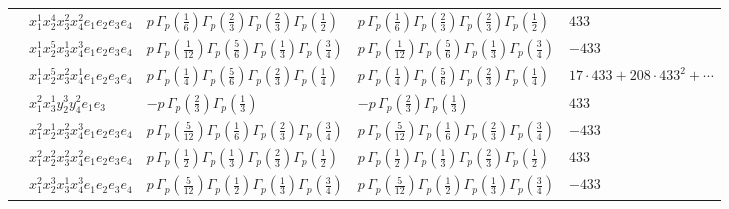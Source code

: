 \documentclass[11pt]{article}
\begin{document}
\begin{table}[ht]
{\begin{tabular}{@{}lllll@{}}
 & $x_{1}^{1} x_{2}^{4} x_{3}^{2} x_{4}^{2}  e_{1} e_{2} e_{3} e_{4}$ & $p \, \Gamma_p \left( \frac{1}{6} \right) \Gamma_p \left( \frac{2}{3} \right) \Gamma_p \left( \frac{2}{3} \right) \Gamma_p \left( \frac{1}{2} \right)$ & $p \, \Gamma_p \left( \frac{1}{6} \right) \Gamma_p \left( \frac{2}{3} \right) \Gamma_p \left( \frac{2}{3} \right) \Gamma_p \left( \frac{1}{2} \right)$ & $433$ \\
 & $x_{1}^{1} x_{2}^{5} x_{3}^{1} x_{4}^{3}  e_{1} e_{2} e_{3} e_{4}$ & $p \, \Gamma_p \left( \frac{1}{12} \right) \Gamma_p \left( \frac{5}{6} \right) \Gamma_p \left( \frac{1}{3} \right) \Gamma_p \left( \frac{3}{4} \right)$ & $p \, \Gamma_p \left( \frac{1}{12} \right) \Gamma_p \left( \frac{5}{6} \right) \Gamma_p \left( \frac{1}{3} \right) \Gamma_p \left( \frac{3}{4} \right)$ & $-433$ \\
 & $x_{1}^{1} x_{2}^{5} x_{3}^{2} x_{4}^{1}  e_{1} e_{2} e_{3} e_{4}$ & $p \, \Gamma_p \left( \frac{1}{4} \right) \Gamma_p \left( \frac{5}{6} \right) \Gamma_p \left( \frac{2}{3} \right) \Gamma_p \left( \frac{1}{4} \right)$ & $p \, \Gamma_p \left( \frac{1}{4} \right) \Gamma_p \left( \frac{5}{6} \right) \Gamma_p \left( \frac{2}{3} \right) \Gamma_p \left( \frac{1}{4} \right)$ & $17{\cdot}433{+}208{\cdot}433^{2}{+}\cdots$ \\
 & $x_{1}^{2} x_{3}^{1} y_{2}^{3} y_{4}^{2} e_{1} e_{3}$ & $- p \, \Gamma_p \left( \frac{2}{3} \right) \Gamma_p \left( \frac{1}{3} \right)$ & $- p \, \Gamma_p \left( \frac{2}{3} \right) \Gamma_p \left( \frac{1}{3} \right)$ & $433$ \\
 & $x_{1}^{2} x_{2}^{1} x_{3}^{2} x_{4}^{3}  e_{1} e_{2} e_{3} e_{4}$ & $p \, \Gamma_p \left( \frac{5}{12} \right) \Gamma_p \left( \frac{1}{6} \right) \Gamma_p \left( \frac{2}{3} \right) \Gamma_p \left( \frac{3}{4} \right)$ & $p \, \Gamma_p \left( \frac{5}{12} \right) \Gamma_p \left( \frac{1}{6} \right) \Gamma_p \left( \frac{2}{3} \right) \Gamma_p \left( \frac{3}{4} \right)$ & $-433$ \\
 & $x_{1}^{2} x_{2}^{2} x_{3}^{2} x_{4}^{2}  e_{1} e_{2} e_{3} e_{4}$ & $p \, \Gamma_p \left( \frac{1}{2} \right) \Gamma_p \left( \frac{1}{3} \right) \Gamma_p \left( \frac{2}{3} \right) \Gamma_p \left( \frac{1}{2} \right)$ & $p \, \Gamma_p \left( \frac{1}{2} \right) \Gamma_p \left( \frac{1}{3} \right) \Gamma_p \left( \frac{2}{3} \right) \Gamma_p \left( \frac{1}{2} \right)$ & $433$ \\
 & $x_{1}^{2} x_{2}^{3} x_{3}^{1} x_{4}^{3}  e_{1} e_{2} e_{3} e_{4}$ & $p \, \Gamma_p \left( \frac{5}{12} \right) \Gamma_p \left( \frac{1}{2} \right) \Gamma_p \left( \frac{1}{3} \right) \Gamma_p \left( \frac{3}{4} \right)$ & $p \, \Gamma_p \left( \frac{5}{12} \right) \Gamma_p \left( \frac{1}{2} \right) \Gamma_p \left( \frac{1}{3} \right) \Gamma_p \left( \frac{3}{4} \right)$ & $-433$ \\

\end{tabular}}
\end{table}
\end{document}
